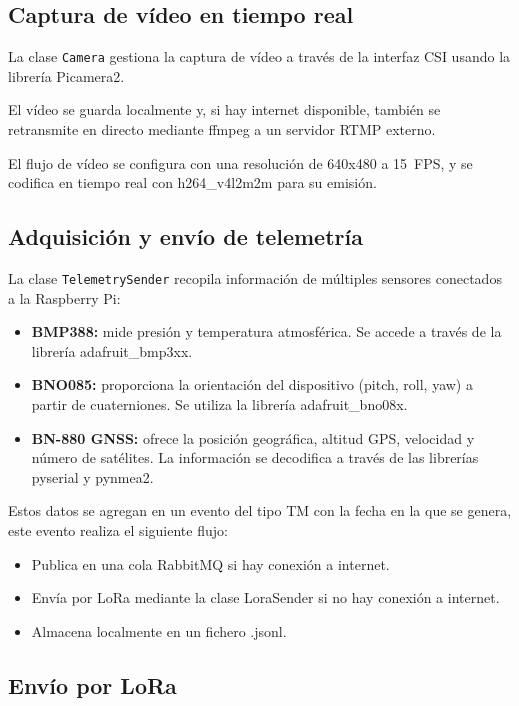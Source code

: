 \subsection{Captura de vídeo en tiempo real}

La clase \texttt{Camera} gestiona la captura de vídeo a través de la interfaz CSI usando la librería Picamera2.

El vídeo se guarda localmente y, si hay internet disponible, también se retransmite en directo mediante ffmpeg a un servidor RTMP externo.

El flujo de vídeo se configura con una resolución de 640x480 a 15~FPS, y se codifica en tiempo real con h264\_v4l2m2m para su emisión.

\subsection{Adquisición y envío de telemetría}

La clase \texttt{TelemetrySender} recopila información de múltiples sensores conectados a la Raspberry Pi:

\begin{itemize}
    \item \textbf{BMP388:} mide presión y temperatura atmosférica.
    Se accede a través de la librería adafruit\_bmp3xx.
    \item \textbf{BNO085:} proporciona la orientación del dispositivo (pitch, roll, yaw) a partir de cuaterniones.
    Se utiliza la librería adafruit\_bno08x.
    \item \textbf{BN-880 GNSS:} ofrece la posición geográfica, altitud GPS, velocidad y número de satélites.
    La información se decodifica a través de las librerías pyserial y pynmea2.
\end{itemize}

Estos datos se agregan en un evento del tipo TM con la fecha en la que se genera, este evento realiza el siguiente flujo:

\begin{itemize}
    \item Publica en una cola RabbitMQ si hay conexión a internet.
    \item Envía por LoRa mediante la clase LoraSender si no hay conexión a internet.
    \item Almacena localmente en un fichero .jsonl.
\end{itemize}

\subsection{Envío por LoRa}

